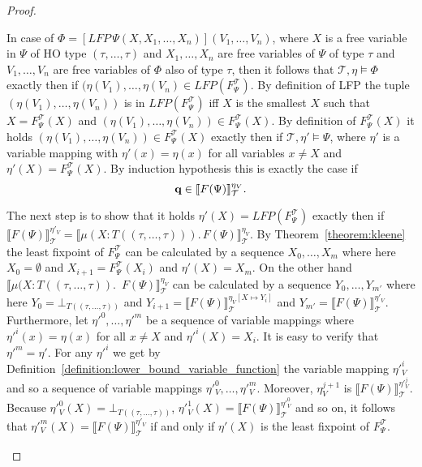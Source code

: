 \begin{proof}
\begin{compactitem}
        \item In case of $\Phi = [LFP\,\Psi(X, X_1, \dots, X_n)](V_1, \dots, V_n)$, where $X$ is a
        free variable in $\Psi$ of HO type $(\tau, \dots, \tau)$ and $X_1, \dots, X_n$ are free
        variables of $\Psi$ of type $\tau$ and $V_1, \dots, V_n$ are free variables of $\Phi$ also of type $\tau$, then
        it follows that $\mathcal{T}, \eta \models \Phi$ exactly then if $(\eta(V_1), \dots, \eta(V_n) \in LFP
        (F_\Psi^\mathcal{T})$. By definition of LFP the tuple $(\eta(V_1), \dots, \eta(V_n))$ is in
        $LFP(F_\Psi^\mathcal{T})$ iff $X$ is the smallest $X$ such that $X = F_\Psi^\mathcal{T}(X)$ and $(\eta(V_1), \dots, \eta(V_n)) \in
        F_\Psi^\mathcal{T}(X)$. By definition of $F_\Psi^\mathcal{T}(X)$ it holds $(\eta
        (V_1), \dots, \eta(V_n)) \in F_\Psi^\mathcal{T}(X)$ exactly then if $\mathcal{T}, \eta' 
        \models \Psi$, where $\eta'$ is a variable mapping with $\eta'(x) = \eta(x)$ for all variables $x \neq X$ and $\eta'(X) = F_\Psi^\mathcal{T}(X)$. By induction hypothesis this is exactly the case if
        \[\emph{q} \in \llbracket  F(\Psi)
        \rrbracket^{\eta_V}_\mathcal{T}.\]

The next step is to show that it holds $\eta'(X) = LFP(F^\mathcal{T}_\Psi)$ exactly then if $\llbracket F(\Psi) \rrbracket^{\eta'_V}_\mathcal{T} = \llbracket \mu (X \colon T((\tau, \dots, \tau))).\,F(\Psi)\rrbracket_\mathcal{T}^{\eta_V}$. 
        By Theorem~\ref{theorem:kleene} the least fixpoint of $F^\mathcal{T}_\Psi$ can be calculated by a sequence $X_0, \dots, X_m$ where here $X_0 = \emptyset$ and $X_{i+1} 
        = F_\Psi^\mathcal{T}(X_i)$ and $\eta'(X) = X_m$. On the other hand $\llbracket \mu (X \colon T((\tau, \dots, \tau)).$ $\,F(\Psi)\rrbracket_\mathcal{T}^{\eta_V}$ can be calculated by a sequence 
         $Y_0, \dots, Y_{m'}$ where here $Y_0 = \bot_{T((\tau, \dots, \tau))}$ and $Y_{i+1} = \llbracket F(\Psi)\rrbracket_\mathcal{T}^{\eta_V[X \mapsto Y_i]}$ and $Y_{m'} = \llbracket F(\Psi)\rrbracket_\mathcal{T}^{\eta'_V}$. Furthermore, let $\eta'^0, \dots, \eta'^m$ be a sequence of variable mappings where $\eta'^i(x) = \eta(x)$ for all $x \neq X$ and $\eta'^i(X) = X_i$. It is easy to verify that $\eta'^m = \eta'$. For any $\eta'^i$ we get by Definition~\ref{definition:lower_bound_variable_function} the variable mapping $\eta'^i_V$ and so a sequence of variable mappings $\eta'^0_V, \dots, \eta'^m_V$. Moreover, $\eta^{j+1}_V$ is $\llbracket F(\Psi)\rrbracket_\mathcal{T}^{\eta'^j_V}$. Because $\eta'^0_V(X) = \bot_{T((\tau, \dots, \tau))}$, $\eta'^1_V(X) =\llbracket F(\Psi)\rrbracket_\mathcal{T}^{\eta'^0_V}$ and so on, it follows that $\eta'^m_V(X) = \llbracket F(\Psi) \rrbracket^{\eta'_V}_\mathcal{T}$ if and only if $\eta'(X)$ is the least fixpoint of $F^\mathcal{T}_\Psi$.
        

\end{compactitem}
\end{proof}
